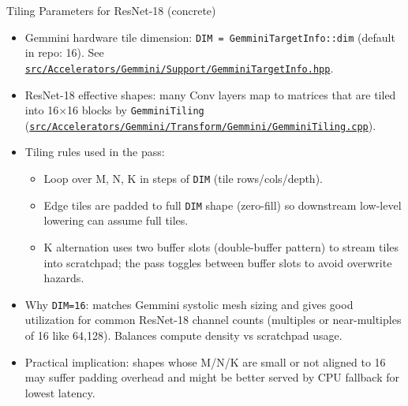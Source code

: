 \documentclass[aspectratio=169,10pt]{beamer}
\newcommand{\code}[1]{\texttt{\footnotesize #1}}
\newcommand{\repoRoot}{/home/lahcen/toolchains/onnx-mlir-xcompile/onnx-mlir}
\newcommand{\pathcode}[1]{\href{run:\repoRoot/#1}{\texttt{\scriptsize #1}}}
\begin{document}
\begin{frame}{Tiling Parameters for ResNet-18 (concrete)}
  \scriptsize
  \begin{itemize}
    \item Gemmini hardware tile dimension: \code{DIM = GemminiTargetInfo::dim} (default in repo: 16). See \pathcode{src/Accelerators/Gemmini/Support/GemminiTargetInfo.hpp}.
    \item ResNet-18 effective shapes: many Conv layers map to matrices that are tiled into 16×16 blocks by \code{GemminiTiling} (\pathcode{src/Accelerators/Gemmini/Transform/Gemmini/GemminiTiling.cpp}).
    \item Tiling rules used in the pass:
      \begin{itemize}
        \item Loop over M, N, K in steps of \code{DIM} (tile rows/cols/depth).
        \item Edge tiles are padded to full \code{DIM} shape (zero-fill) so downstream low-level lowering can assume full tiles.
        \item K alternation uses two buffer slots (double-buffer pattern) to stream tiles into scratchpad; the pass toggles between buffer slots to avoid overwrite hazards.
      \end{itemize}
    \item Why \code{DIM=16}: matches Gemmini systolic mesh sizing and gives good utilization for common ResNet-18 channel counts (multiples or near-multiples of 16 like 64,128). Balances compute density vs scratchpad usage.
    \item Practical implication: shapes whose M/N/K are small or not aligned to 16 may suffer padding overhead and might be better served by CPU fallback for lowest latency.
  \end{itemize}
\end{frame}
\end{document}
